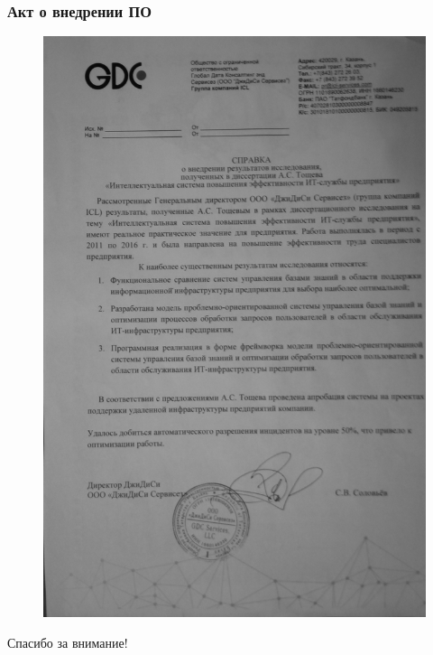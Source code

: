\documentclass[14pt]{beamer}
\begin{document}
\begin{frame}
\frametitle{Акт о внедрении ПО}
\begin{figure} [h] 
  \center
  \includegraphics [scale=0.05] {ActVnedr} 
  \label{img:ActVnedr}  
\end{figure}



\end{frame}


\begin{frame}
\begin{center}
Спасибо за внимание!
\end{center}
\end{frame}
\end{document}
